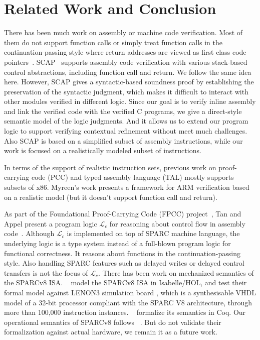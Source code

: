 \section{Related Work and Conclusion}
\label{sec:conclusion}

There has been much work on assembly or
machine code verification. Most of them
do not support function calls or simply
treat function calls in the continuation-passing
style where return addresses are viewed as first
class code pointers~\cite{PCC,FPCC,TAL,TALx86,Yu03ESOP,xcap,cflogic}.
SCAP~\cite{Feng06pldi} supports assembly code verification
with various stack-based control abstractions, including
function call and return. We follow the same idea here.
However, SCAP gives a syntactic-based soundness proof
by establishing the preservation of the syntactic judgment,
which makes it difficult to interact with other modules
verified in different logic. Since our goal is to
verify inline assembly and link the verified code
with the verified C programs, we give a direct-style
semantic model of the logic judgments. And it allows us 
to extend our program logic to support verifying 
contextual refinement without meet much challenges. 
Also SCAP
is based on a simplified subset of assembly instructions,
while our work is focused on a realistically modeled
subset of \sparc{} instructions.

In terms of the support of realistic instruction sets,
previous work on proof-carrying code (PCC) and
typed assembly language (TAL) mostly supports subsets of
x86.
Myreen's work \cite{arm-veri} presents a framework for
ARM verification based on a realistic model
(but it doesn't support function call and return).

As part of the Foundational Proof-Carrying Code (FPCC)
project~\cite{FPCC},
Tan and Appel present a program logic $\mathcal{L}_c$
for reasoning about control flow in assembly code~\cite{cflogic}.
Although $\mathcal{L}_c$ is implemented on top of SPARC machine
language, the underlying logic is a type system instead
of a full-blown program logic for functional correctness.
It reasons about functions in the continuation-passing
style. Also 
handling SPARC features such as delayed writes or delayed
control transfers is not the focus of $\mathcal{L}_c$.
There has been work on mechanized semantics of the SPARCv8 ISA.
~\cite{sparcv8-formalization-Isabelle} model the SPARCv8 ISA
in Isabelle/HOL, and test their formal model against 
LENON3 simulation board \cite{LEON3}, 
which is a synthesisable VHDL model of a 32-bit processor 
compliant with the SPARC V8 architecture, 
through more than 100,000 instruction instances.   
~\cite{sparc-formalization} formalize its semantics in Coq.
Our operational semantics of SPARCv8 follows ~\cite{sparc-formalization}.
But  do not validate their formalization against actual 
hardware, we remain it as a future work. 

